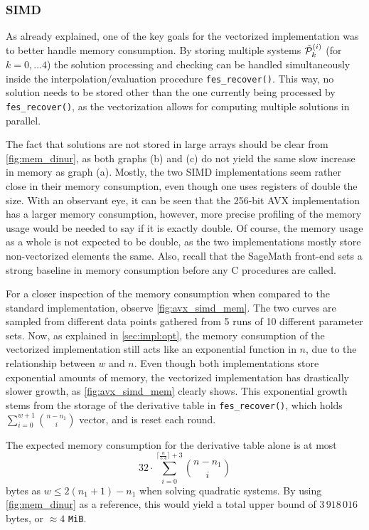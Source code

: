 \subsubsection{SIMD}
As already explained, one of the key goals for the vectorized implementation was to better handle memory consumption. By storing multiple systems $\Tilde{\mathcal{P}}^{(i)}_k$ (for $k = 0, \dots 4$) the solution processing and checking can be handled simultaneously inside the interpolation/evaluation procedure \texttt{fes\_recover()}. This way, no solution needs to be stored other than the one currently being processed by \texttt{fes\_recover()}, as the vectorization allows for computing multiple solutions in parallel.

The fact that solutions are not stored in large arrays should be clear from \cref{fig:mem_dinur}, as both graphs (b) and (c) do not yield the same slow increase in memory as graph (a). Mostly, the two SIMD implementations seem rather close in their memory consumption, even though one uses registers of double the size. With an observant eye, it can be seen that the 256-bit AVX implementation has a larger memory consumption, however, more precise profiling of the memory usage would be needed to say if it is exactly double. Of course, the memory usage as a whole is not expected to be double, as the two implementations mostly store non-vectorized elements the same. Also, recall that the SageMath front-end sets a strong baseline in memory consumption before any C procedures are called. 

For a closer inspection of the memory consumption when compared to the standard implementation, observe \cref{fig:avx_simd_mem}. The two curves are sampled from different data points gathered from 5 runs of 10 different parameter sets. Now, as explained in \cref{sec:impl:opt}, the memory consumption of the vectorized implementation still acts like an exponential function in $n$, due to the relationship between $w$ and $n$. Even though both implementations store exponential amounts of memory, the vectorized implementation has drastically slower growth, as \cref{fig:avx_simd_mem} clearly shows. This exponential growth stems from the storage of the derivative table in \texttt{fes\_recover()}, which holds $\sum_{i = 0}^{w + 1} \binom{n - n_1}{i}$ vector, and is reset each round.

The expected memory consumption for the derivative table alone is at most 
$$
    32 \cdot \sum_{i = 0}^{\lceil \frac{n}{5.4} \rceil + 3} \binom{n - n_1}{i}
$$
bytes as $w \leq 2 (n_1 + 1) - n_1$ when solving quadratic systems. By using \cref{fig:mem_dinur} as a reference, this would yield a total upper bound of $3\,918\,016$ bytes, or $\approx 4$ \texttt{MiB}. 

